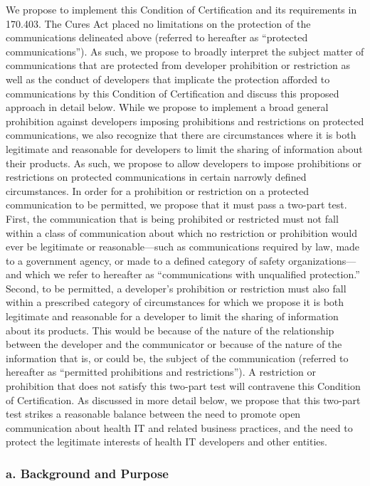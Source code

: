 \documentclass[twoside,11pt]{article}
\begin{document}
          We propose to implement this Condition of Certification and its requirements in \textsection{} 170.403. The Cures Act placed no limitations on the protection of the communications delineated above (referred to hereafter as “protected communications”). As such, we propose to broadly interpret the subject matter of communications that are protected from developer prohibition or restriction as well as the conduct of developers that implicate the protection afforded to communications by this Condition of Certification and discuss this proposed approach in detail below. While we propose to implement a broad general prohibition against developers imposing prohibitions and restrictions on protected communications, we also recognize that there are circumstances where it is both legitimate and reasonable for developers to limit the sharing of information about their products. As such, we propose to allow developers to impose prohibitions or restrictions on protected communications in certain narrowly defined circumstances. In order for a prohibition or restriction on a protected communication to be permitted, we propose that it must pass a two-part test. First, the communication that is being prohibited or restricted must not fall within a class of communication about which no restriction or prohibition would ever be legitimate or reasonable—such as communications required by law, made to a government agency, or made to a defined category of safety organizations—and which we refer to hereafter as “communications with unqualified protection.” Second, to be permitted, a developer's prohibition or restriction must also fall within a prescribed category of circumstances for which we propose it is both legitimate and reasonable for a developer to limit the sharing of information about its products. This would be because of the nature of the relationship between the developer and the communicator or because of the nature of the information that is, or could be, the subject of the communication (referred to hereafter as “permitted prohibitions and restrictions”). A restriction or prohibition that does not satisfy this two-part test will contravene this Condition of Certification. As discussed in more detail below, we propose that this two-part test strikes a reasonable balance between the need to promote open communication about health IT and related business practices, and the need to protect the legitimate interests of health IT developers and other entities.


          \subsubsection{a. Background and Purpose}
\end{document}
